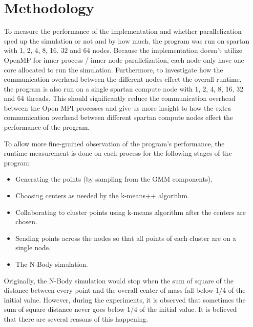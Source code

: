 \documentclass{article}
\begin{document}
\section*{Methodology}
To measure the performance of the implementation and whether parallelization sped up the simulation
or not and by how much, the program was run on spartan with 1, 2, 4, 8, 16, 32 and 64 nodes. Because
the implementation doesn't utilize OpenMP for inner process / inner node parallelization, each node
only have one core allocated to run the simulation. Furthermore, to investigate how the
communication overhead between the different nodes effect the overall runtime, the program is also
run on a single spartan compute node with 1, 2, 4, 8, 16, 32 and 64 threads. This should
significantly reduce the communication overhead between the Open MPI processes and give us more
insight to how the extra communication overhead between different spartan compute nodes effect the
performance of the program.

To allow more fine-grained observation of the program's performance, the runtime measurement is done
on each process for the following stages of the program:
\begin{itemize}
	\item Generating the points (by sampling from the GMM components).
	\item Choosing centers as needed by the k-means++ algorithm.
	\item Collaborating to cluster points using k-means algorithm after the centers are chosen.
	\item Sending points across the nodes so that all points of each cluster are on a single node.
	\item The N-Body simulation.
\end{itemize}

Originally, the N-Body simulation would stop when the sum of square of the distance between every
point and the overall center of mass fall below 1/4 of the initial value. However, during the
experiments, it is observed that sometimes the sum of square distance never goes below 1/4 of the
initial value. It is believed that there are several reasons of this happening.
\end{document}
